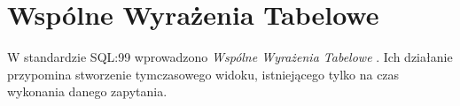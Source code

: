 \section{Wspólne Wyrażenia Tabelowe}











W standardzie SQL:99 wprowadzono \emph{Wspólne Wyrażenia Tabelowe} .
Ich działanie przypomina stworzenie tymczasowego widoku, 
istniejącego tylko na czas wykonania danego zapytania.


